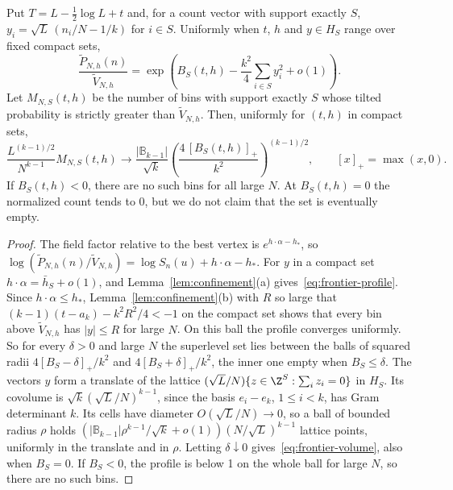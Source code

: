 \begin{theorem}\label{thm:frontier-superlevel}
Put $T=L-\frac12\log L+t$ and, for a count vector with support exactly $S$,
$y_i=\sqrt L\,(n_i/N-1/k)$ for $i\in S$. Uniformly when $t$, $h$ and $y\in H_S$
range over fixed compact sets,
\begin{equation}\label{eq:frontier-profile}
 \frac{\widetilde P_{N,h}(n)}{\widetilde V_{N,h}}
 =\exp\left(B_S(t,h)-\frac{k^2}{4}\sum_{i\in S}y_i^2+o(1)\right).
\end{equation}
Let $M_{N,S}(t,h)$ be the number of bins with support exactly $S$ whose tilted
probability is strictly greater than $\widetilde V_{N,h}$. Then, uniformly for
$(t,h)$ in compact sets,
\begin{equation}\label{eq:frontier-volume}
 \frac{L^{(k-1)/2}}{N^{k-1}}M_{N,S}(t,h)
 \longrightarrow
 \frac{|\mathbb B_{k-1}|}{\sqrt k}
 \left(\frac{4\,[B_S(t,h)]_+}{k^2}\right)^{(k-1)/2},
 \qquad [x]_+=\max(x,0).
\end{equation}
If $B_S(t,h)<0$, there are no such bins for all large $N$. At $B_S(t,h)=0$ the
normalized count tends to 0, but we do not claim that the set is eventually
empty.
\end{theorem}

\begin{proof}
The field factor relative to the best vertex is $e^{h\cdot\alpha-h_*}$, so
$\log(\widetilde P_{N,h}(n)/\widetilde V_{N,h})=\log S_n(u)+h\cdot\alpha-h_*$. For
$y$ in a compact set $h\cdot\alpha=\bar h_S+o(1)$, and
Lemma~\ref{lem:confinement}(a) gives~\eqref{eq:frontier-profile}. Since
$h\cdot\alpha\le h_*$, Lemma~\ref{lem:confinement}(b) with $R$ so large that
$(k-1)(t-a_k)-k^2R^2/4<-1$ on the compact set shows that every bin above
$\widetilde V_{N,h}$ has $|y|\le R$ for large $N$. On this ball the profile
converges uniformly. So for every $\delta>0$ and large $N$ the superlevel set
lies between the balls of squared radii $4[B_S-\delta]_+/k^2$ and
$4[B_S+\delta]_+/k^2$, the inner one empty when $B_S\le\delta$. The vectors $y$
form a translate of the lattice $(\sqrt L/N)\{z\in\Z^S:\sum_iz_i=0\}$ in $H_S$.
Its covolume is $\sqrt k(\sqrt L/N)^{k-1}$, since the basis $e_i-e_k$,
$1\le i<k$, has Gram determinant $k$. Its cells have diameter
$O(\sqrt L/N)\to0$, so a ball of bounded radius $\rho$ holds
$(|\mathbb B_{k-1}|\rho^{k-1}/\sqrt k+o(1))(N/\sqrt L)^{k-1}$ lattice points,
uniformly in the translate and in $\rho$. Letting $\delta\downarrow0$
gives~\eqref{eq:frontier-volume}, also when $B_S=0$. If $B_S<0$, the profile is
below 1 on the whole ball for large $N$, so there are no such bins.
\end{proof}


